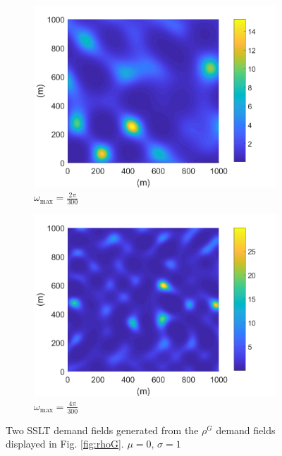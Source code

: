 \documentclass[12pt,dvipsnames]{report}
\begin{document}
\begin{figure}[!ht]
\centering
\begin{subfigure}{.45\textwidth}
	\centering
	\includegraphics[width=1\linewidth]{rho_O2pi-300_L50_X1000_Y1000}
	\caption{\small $\omega_{\max}=\frac{2\pi}{300}$}
	\label{fig:rho_2pi-300}
\end{subfigure}
\hspace{0.5cm}
\begin{subfigure}{.45\textwidth}
	\centering
	\includegraphics[width=1\linewidth]{rho_O4pi-300_L50_X1000_Y1000}
	\caption{\small $\omega_{\max}=\frac{4\pi}{300}$}
	\label{fig:rho_4pi-300}
\end{subfigure}
\caption[Generated example SSLT demand fields]{\small Two SSLT demand fields generated from the $\rho^G$ demand fields displayed in Fig. \ref{fig:rhoG}. $\mu = 0,\, \sigma = 1$}
\label{fig:rho}
\end{figure}
\end{document}
